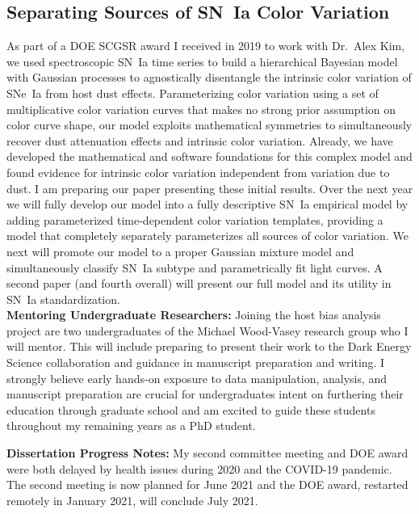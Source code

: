 \documentclass[modern]{aastex63}
\begin{document}
\subsection{Separating Sources of SN~Ia Color Variation}
As part of a DOE SCGSR award I received in 2019 to work with Dr.~Alex Kim, we used spectroscopic SN~Ia time series to build a hierarchical Bayesian model with Gaussian processes to agnostically disentangle the intrinsic color variation of SNe~Ia from host dust effects.
Parameterizing color variation using a set of multiplicative color variation curves that makes no strong prior assumption on color curve shape, our model exploits mathematical symmetries to simultaneously recover dust attenuation effects and intrinsic color variation.
Already, we have developed the mathematical and software foundations for this complex model and found evidence for intrinsic color variation independent from variation due to dust.
I am preparing our paper presenting these initial results.
Over the next year we will fully develop our model into a fully descriptive SN~Ia empirical model by adding parameterized time-dependent color variation templates, providing a model that completely separately parameterizes all sources of color variation. 
We next will promote our model to a proper Gaussian mixture model and simultaneously classify SN~Ia subtype and parametrically fit light curves.  
A second paper (and fourth overall) will present our full model and its utility in SN~Ia standardization.\\

{\bf Mentoring Undergraduate Researchers:}
Joining the host bias analysis project are two undergraduates of the Michael Wood-Vasey research group who I will mentor.  This will include preparing to present their work to the Dark Energy Science collaboration and guidance in manuscript preparation and writing.  I strongly believe early hands-on exposure to data manipulation, analysis, and manuscript preparation are crucial for undergraduates intent on furthering their education through graduate school and am excited to guide these students throughout my remaining years as a PhD student.  

{\bf Dissertation Progress Notes:}
My second committee meeting and DOE award were both delayed by health issues during 2020 and the COVID-19 pandemic. 
The second meeting is now planned for June 2021 and the DOE award, restarted remotely in January 2021, will conclude July 2021. 

\newpage


\end{document}
